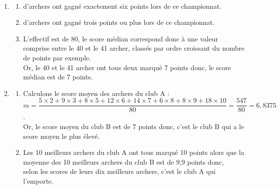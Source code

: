 \begin{corrige}
\ \\ [-5mm]
   \begin{enumerate}
      \item
         \begin{enumerate}
            \item { d'archers} ont gagné exactement six points lors de ce championnat.
            \item { d'archers} ont gagné trois points ou plus lors de ce championnat.
            \item L'effectif est de 80, le score médian correspond donc à une valeur comprise entre le 40 et le 41 archer, classés par ordre croissant du nombre de points par exemple. \\
               Or, le 40 et le 41 archer ont tous deux marqué 7 points donc, {\blue le score médian est de 7 points.}
         \end{enumerate}
      \setcounter{enumi}{1}
      \item 
         \begin{enumerate}
            \item Calculons le score moyen des archers du club A : \\ [1mm]
               $m =\dfrac{5\times2+9\times3+8\times5+12\times6+14\times7+6\times8+8\times9+18\times10}{80} =\dfrac{547}{80} =6,8375$. \\ [2mm]
               Or, le score moyen du club B est de 7 points donc, {\blue c'est le club B qui a le score moyen le plus élevé}.
            \item Les 10 meilleurs archers du club A ont tous marqué 10 points alors que la moyenne des 10 meilleurs archers du club B est de 9,9 points donc, \\
            {\blue selon les scores de leurs dix meilleurs archers, c'est le club A qui l'emporte}.
         \end{enumerate}
   \end{enumerate}
\end{corrige}


